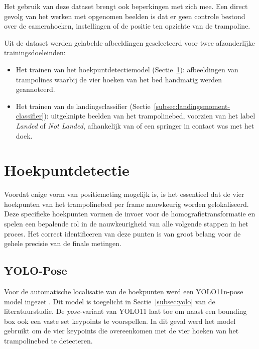 Het gebruik van deze dataset brengt ook beperkingen met zich mee. Een direct gevolg van het werken met opgenomen beelden is dat er geen controle bestond over de camerahoeken, instellingen of de positie ten opzichte van de trampoline.

Uit de dataset werden gelabelde afbeeldingen geselecteerd voor twee afzonderlijke trainingsdoeleinden:
\begin{itemize}
    \item Het trainen van het hoekpuntdetectiemodel (Sectie~\ref{sec:trampolinedetectie}): afbeeldingen van trampolines waarbij de vier hoeken van het bed handmatig werden geannoteerd.
    \item Het trainen van de landingsclassifier (Sectie~\ref{subsec:landingsmoment-classifier}): uitgeknipte beelden van het trampolinebed, voorzien van het label \textit{Landed} of \textit{Not Landed}, afhankelijk van of een springer in contact was met het doek.
\end{itemize}


\section{Hoekpuntdetectie}
\label{sec:trampolinedetectie}

Voordat enige vorm van positiemeting mogelijk is, is het essentieel dat de vier hoekpunten van het trampolinebed per frame nauwkeurig worden gelokaliseerd. Deze specifieke hoekpunten vormen de invoer voor de homografietransformatie en spelen een bepalende rol in de nauwkeurigheid van alle volgende stappen in het proces. Het correct identificeren van deze punten is van groot belang voor de gehele precisie van de finale metingen.

\subsection{YOLO-Pose}
\label{subsec:hoekpuntdetectie}

Voor de automatische localisatie van de hoekpunten werd een YOLO11n-pose model ingezet \autocite{Jocher_Ultralytics_YOLO_2023}. Dit model is toegelicht in Sectie~\ref{subsec:yolo} van de literatuurstudie. De \textit{pose}-variant van YOLO11 laat toe om naast een bounding box ook een vaste set keypoints te voorspellen. In dit geval werd het model gebruikt om de vier keypoints die overeenkomen met de vier hoeken van het trampolinebed te detecteren.

